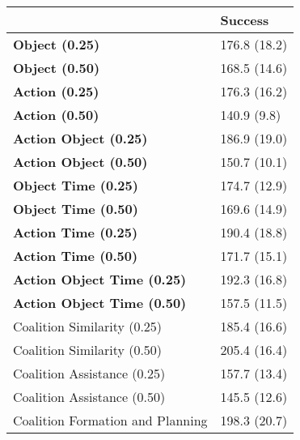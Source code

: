 \begin{tabular}{ll}
\hline
                                    & Success      \\
\hline
 \textbf{Object (0.25)}             & 176.8 (18.2) \\
 \textbf{Object (0.50)}             & 168.5 (14.6) \\
 \textbf{Action (0.25)}             & 176.3 (16.2) \\
 \textbf{Action (0.50)}             & 140.9 (9.8)  \\
 \textbf{Action Object (0.25)}      & 186.9 (19.0) \\
 \textbf{Action Object (0.50)}      & 150.7 (10.1) \\
 \textbf{Object Time (0.25)}        & 174.7 (12.9) \\
 \textbf{Object Time (0.50)}        & 169.6 (14.9) \\
 \textbf{Action Time (0.25)}        & 190.4 (18.8) \\
 \textbf{Action Time (0.50)}        & 171.7 (15.1) \\
 \textbf{Action Object Time (0.25)} & 192.3 (16.8) \\
 \textbf{Action Object Time (0.50)} & 157.5 (11.5) \\
 Coalition Similarity (0.25)        & 185.4 (16.6) \\
 Coalition Similarity (0.50)        & 205.4 (16.4) \\
 Coalition Assistance (0.25)        & 157.7 (13.4) \\
 Coalition Assistance (0.50)        & 145.5 (12.6) \\
 Coalition Formation and Planning   & 198.3 (20.7) \\
\hline
\end{tabular}
